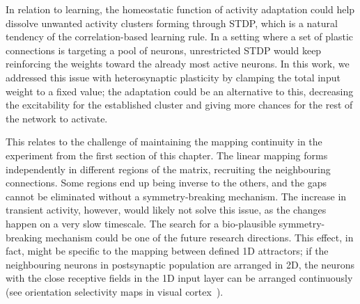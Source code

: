 In relation to learning, the homeostatic function of activity adaptation could help dissolve unwanted activity clusters forming through STDP, which is a natural tendency of the correlation-based learning rule. In a setting where a set of plastic connections is targeting a pool of neurons, unrestricted STDP would keep reinforcing the weights toward the already most active neurons. In this work, we addressed this issue with heterosynaptic plasticity by clamping the total input weight to a fixed value; the adaptation could be an alternative to this, decreasing the excitability for the established cluster and giving more chances for the rest of the network to activate.

This relates to the challenge of maintaining the mapping continuity in the experiment from the first section of this chapter. The linear mapping forms independently in different regions of the matrix, recruiting the neighbouring connections. Some regions end up being inverse to the others, and the gaps cannot be eliminated without a symmetry-breaking mechanism. The increase in transient activity, however, would likely not solve this issue, as the changes happen on a very slow timescale. The search for a bio-plausible symmetry-breaking mechanism could be one of the future research directions. This effect, in fact, might be specific to the mapping between defined 1D attractors; if the neighbouring neurons in postsynaptic population are arranged in 2D, the neurons with the close receptive fields in the 1D input layer can be arranged continuously (see orientation selectivity maps in visual cortex~\cite{Ferster_Miller00, Mariño_etal05}).\\











